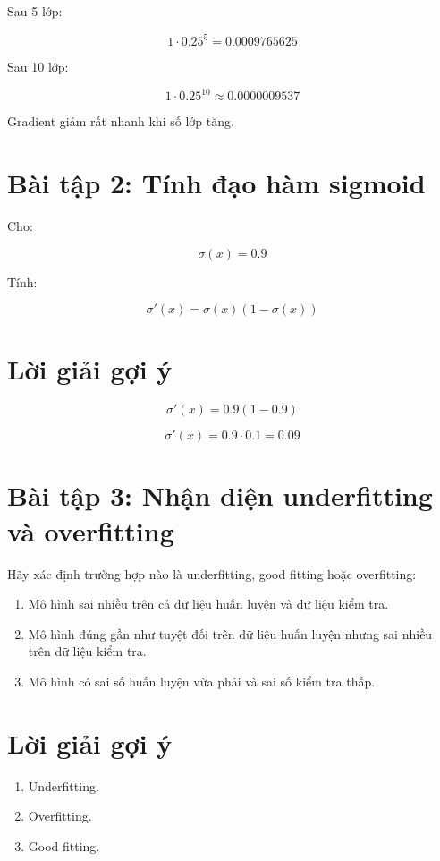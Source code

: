 \documentclass[12pt,a4paper]{report}
\begin{document}
Sau 5 lớp:

\[
    1\cdot 0.25^5
    =
    0.0009765625
\]

Sau 10 lớp:

\[
    1\cdot 0.25^{10}
    \approx
    0.0000009537
\]

Gradient giảm rất nhanh khi số lớp tăng.

\section*{Bài tập 2: Tính đạo hàm sigmoid}

Cho:

\[
    \sigma(x)=0.9
\]

Tính:

\[
    \sigma'(x)=\sigma(x)(1-\sigma(x))
\]

\section*{Lời giải gợi ý}

\[
    \sigma'(x)=0.9(1-0.9)
\]

\[
    \sigma'(x)=0.9\cdot 0.1=0.09
\]

\section*{Bài tập 3: Nhận diện underfitting và overfitting}

Hãy xác định trường hợp nào là underfitting, good fitting hoặc overfitting:

\begin{enumerate}
    \item Mô hình sai nhiều trên cả dữ liệu huấn luyện và dữ liệu kiểm tra.
    \item Mô hình đúng gần như tuyệt đối trên dữ liệu huấn luyện nhưng sai nhiều trên dữ liệu kiểm tra.
    \item Mô hình có sai số huấn luyện vừa phải và sai số kiểm tra thấp.
\end{enumerate}

\section*{Lời giải gợi ý}

\begin{enumerate}
    \item Underfitting.
    \item Overfitting.
    \item Good fitting.
\end{enumerate}
\end{document}
